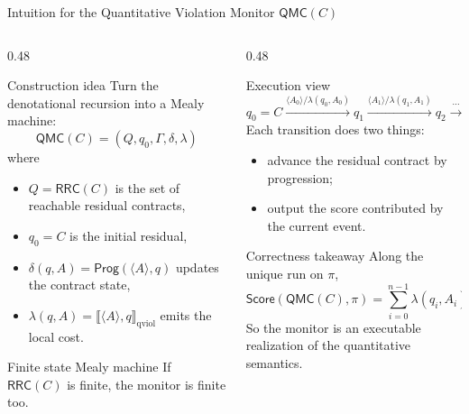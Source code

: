 \documentclass[9pt,aspectratio=169]{beamer}
\newcommand{\Prog}{\ensuremath{\mathsf{Prog}}\xspace}
\newcommand{\trace}[1]{\ensuremath{\langle #1 \rangle}\xspace}
\newcommand{\qsem}[1]{\llbracket #1 \rrbracket_{\text{qviol}}}
\newcommand{\qscore}{\ensuremath{\mathsf{Score}}}
\newcommand{\qmc}{\ensuremath{\mathsf{QMC}}}
\newcommand{\rrcs}[1]{\ensuremath{\mathsf{RRC}\!\left(#1\right)}\xspace}
\begin{document}
\begin{frame}{Intuition for the Quantitative Violation Monitor $\qmc(C)$}
\footnotesize
\begin{columns}[T,totalwidth=\textwidth]
\begin{column}{0.48\textwidth}
  \begin{block}{Construction idea}
    Turn the denotational recursion into a Mealy machine:
    \[
    \qmc(C)=(Q,q_0,\Gamma,\delta,\lambda)
    \]
    where
    \begin{itemize}
      \item $Q=\rrcs{C}$ is the set of reachable residual contracts,
      \item $q_0=C$ is the initial residual,
      \item $\delta(q,A)=\Prog(\trace{A},q)$ updates the contract state,
      \item $\lambda(q,A)=\qsem{\trace{A},q}$ emits the local cost.
    \end{itemize}
  \end{block}

  \begin{block}{Finite state Mealy machine} 
    If $\rrcs{C}$ is finite, the monitor is finite too.
  \end{block}
\end{column}
\begin{column}{0.48\textwidth}
  \begin{block}{Execution view}
    \[
    q_0=C
    \xrightarrow{\trace{A_0}/\lambda(q_0,A_0)} q_1
    \xrightarrow{\trace{A_1}/\lambda(q_1,A_1)} q_2
    \xrightarrow{\ \cdots\ } q_n
    \]
    Each transition does two things:
    \begin{itemize}
      \item advance the residual contract by progression;
      \item output the score contributed by the current event.
    \end{itemize}
  \end{block}

  \begin{block}{Correctness takeaway}
    Along the unique run on $\pi$,
    \[
    \qscore(\qmc(C),\pi)
    =
    \sum_{i=0}^{n-1}\lambda(q_i,A_i)
    =
    \qsem{\pi,C}.
    \]
    So the monitor is an executable realization of the quantitative semantics.
  \end{block}
\end{column}
\end{columns}
\end{frame}
\end{document}
